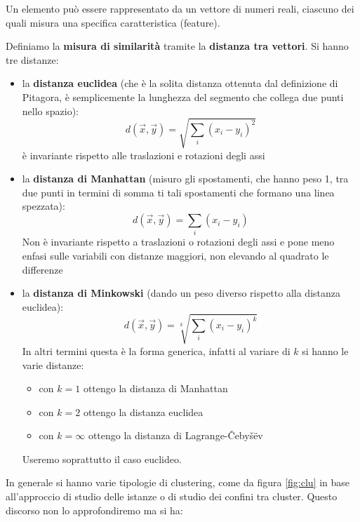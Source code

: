 Un elemento può essere rappresentato da un vettore di numeri reali, ciascuno dei
quali misura una specifica caratteristica (feature).\\
\begin{definizione}
  Definiamo la \textbf{misura di similarità} tramite la \textbf{distanza tra
    vettori}. Si hanno tre distanze:
  \begin{itemize}
    \item la \textbf{distanza euclidea} (che è la solita distanza ottenuta dal
    definizione di Pitagora, è semplicemente la lunghezza del segmento che collega
    due punti nello spazio):
    \[d(\vec{x},\vec{y})=\sqrt{\sum_i (x_i-y_i)^2}\]
    è invariante rispetto alle  traslazioni e rotazioni degli assi
    \item la \textbf{distanza di Manhattan} (misuro gli spostamenti, che hanno
    peso 1, tra due punti in termini di somma ti tali spostamenti che formano
    una linea spezzata):
    \[d(\vec{x},\vec{y})=\sum_i (x_i-y_i)\]
    Non è invariante rispetto a traslazioni o rotazioni degli assi e pone meno
    enfasi sulle variabili con distanze maggiori, non elevando al quadrato le
    differenze
    
    \item la \textbf{distanza di Minkowski} (dando un peso diverso rispetto alla
    distanza euclidea):
    \[d(\vec{x},\vec{y})=\sqrt[k]{\sum_i (x_i-y_i)^k}\]
    In altri termini questa è la forma generica, infatti al variare di $k$ si
    hanno le varie distanze:
    \begin{itemize}
      \item con $k=1$ ottengo la distanza di Manhattan
      \item con $k=2$ ottengo la distanza euclidea
      \item con $k=\infty$ ottengo la distanza di Lagrange-\v{C}eby\v{s}\"{e}v
    \end{itemize}
    Useremo soprattutto il caso euclideo.
  \end{itemize}
\end{definizione}
In generale si hanno varie tipologie di clustering, come da figura \ref{fig:clu}
in base all'approccio di studio delle istanze o di studio dei confini tra
cluster. Questo discorso non lo approfondiremo ma si ha:
